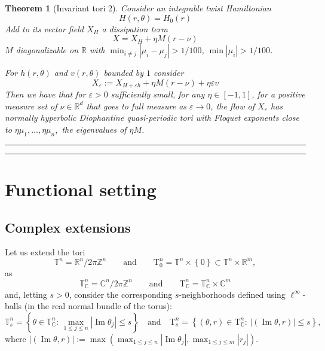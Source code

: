 \documentclass[oneside, 11pt]{amsbook}
\newcommand{\set}[1]{{\left\{#1\right\}}}
\newcommand{\pa}[1]{{\left(#1\right)}}
\newcommand{\abs}[1]{{\left|#1\right|}}
\newcommand{\normal}{\mathrm}
\newcommand{\T}{\mathbb{T}}
\newcommand{\Z}{\mathbb{Z}}
\newcommand{\R}{\mathbb{R}}
\newcommand{\C}{\mathbb{C}}
\newcommand{\teta}{\theta}
\newcommand{\eps}{\varepsilon}
\renewcommand{\Im}{\operatorname{Im}}
\newcommand{\0}{{(0)}}
\newcommand{\3}{{(3)}}
\newtheorem{thm}{Theorem}[section]
\numberwithin{equation}{section}
\numberwithin{defn}{section}
\numberwithin{prop}{section}
\numberwithin{cor}{section}
\numberwithin{lemma}{section}
\numberwithin{rmk}{section}
\numberwithin{corollary}{section}
\begin{document}
\medskip


\begin{thm}[Invariant tori 2]\label{th.NF4} Consider an integrable twist Hamiltonian 
$$H(r,\theta)=H_0(r)$$
Add to its vector field $X_H$ a dissipation term 
$$X=X_H+\eta M (r-\nu)$$
$M$  diagonalizable on $\R$ with $\min_{i\neq j}|\mu_i-\mu_j|>1/100$, $\min |\mu_i|>1/100$. 

For $h(r,\theta)$ and $v(r,\theta)$ bounded by $1$ consider 
$$X_\eps:=X_{H+\eps h}+\eta M (r-\nu)+\eta \eps v$$
Then we have that for $\eps>0$ sufficiently small, for any $\eta \in [-1,1]$, for a positive measure set of $\nu \in \R^d$ that goes to full measure as $\eps \to 0$, the flow of $X_\eps$ has normally hyperbolic Diophantine quasi-periodic tori with Floquet exponents close to $\eta \mu_1,\ldots,\eta \mu_n,$ the eigenvalues of $\eta M$.
\end{thm}


\rule{\textwidth}{0.4pt}


\rule{\textwidth}{0.4pt}


\section{Functional setting}
\subsection{Complex extensions}
\label{complex extensions}
Let us extend the tori \[\T^n=\R^n/{2\pi\Z^n}\qquad \text{and}\qquad \normal{T}^n_0=\T^n\times\set{0}\subset\T^n\times\R^m,\] as \[\T^n_{\C}= \C^n/{2\pi\Z^n}\qquad \text{and} \qquad  \text{T}^n_\C = \T^n_{\C}\times\C^m\]  and, letting $s>0$, consider the corresponding $s$-neighborhoods defined using $\ell^\infty$-balls (in the real normal bundle of the torus): \[\T^n_s=\set{\teta\in\T^n_{\C}:\, \max_{1\leq j \leq n}\abs{\Im\teta_j}\leq s}\quad\text{and}\quad \text{T}^n_s=\set{\pa{\teta,r}\in\text{T}^n_{\C}:\, \abs{(\Im\teta,r)}\leq s},\]
where $\abs{(\Im\teta,r)}:= \max\pa{\max_{1\leq j\leq n}\abs{\Im\teta_j},\max_{1\leq j\leq m}\abs{r_j}}$. \\
\end{document}

